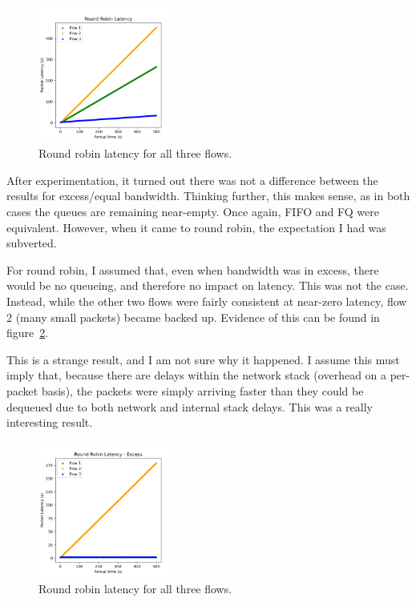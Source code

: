\documentclass[conference]{IEEEtran}
\begin{document}
\begin{figure}[htbp]
    \centering
    \includegraphics[width=0.4\textwidth]{../img/rr_latency}
    \caption{Round robin latency for all three flows.}
    \label{fig:rr_cong}
\end{figure}

After experimentation, it turned out there was not a difference between the results for excess/equal bandwidth.
Thinking further, this makes sense, as in both cases the queues are remaining near-empty.
Once again, FIFO and FQ were equivalent.
However, when it came to round robin, the expectation I had was subverted.

For round robin, I assumed that, even when bandwidth was in excess, there would be no queueing, and therefore no impact
on latency.
This was not the case.
Instead, while the other two flows were fairly consistent at near-zero latency, flow 2 (many small packets) became
backed up.
Evidence of this can be found in figure~\ref{fig:rr_exc}.

This is a strange result, and I am not sure why it happened.
I assume this must imply that, because there are delays within the network stack (overhead on a per-packet basis),
the packets were simply arriving faster than they could be dequeued due to both network and internal stack delays.
This was a really interesting result.

\begin{figure}[htbp]
    \centering
    \includegraphics[width=0.4\textwidth]{../img/rr_excess}
    \caption{Round robin latency for all three flows.}
    \label{fig:rr_exc}
\end{figure}
\end{document}
